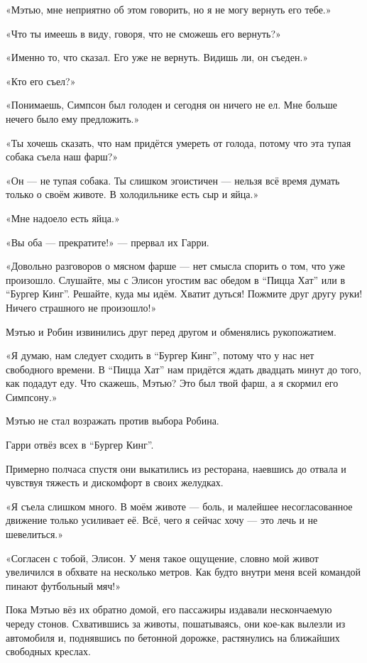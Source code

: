 \documentclass[a5paper, 9pt,
final, openany, twoside=true]{memoir}
\begin{document}
«Мэтью, мне неприятно об этом говорить, но я не могу вернуть его тебе.»

«Что ты имеешь в виду, говоря, что не сможешь его вернуть?»

«Именно то, что сказал. Его уже не вернуть. Видишь ли, он съеден.»

«Кто его съел?»

«Понимаешь, Симпсон был голоден и сегодня он ничего не ел. Мне больше нечего было ему предложить.»

«Ты хочешь сказать, что нам придётся умереть от голода, потому что эта тупая собака съела наш фарш?»

«Он — не тупая собака. Ты слишком эгоистичен — нельзя всё время думать только о своём животе. В холодильнике есть сыр и яйца.»

«Мне надоело есть яйца.»

«Вы оба — прекратите!» — прервал их Гарри.

«Довольно разговоров о мясном фарше — нет смысла спорить о том, что уже произошло. Слушайте, мы с Элисон угостим вас обедом в ``Пицца Хат'' или в ``Бургер Кинг''. Решайте, куда мы идём. Хватит дуться! Пожмите друг другу руки! Ничего страшного не произошло!»

Мэтью и Робин извинились друг перед другом и обменялись рукопожатием.

«Я думаю, нам следует сходить в ``Бургер Кинг'', потому что у нас нет свободного времени. В ``Пицца Хат'' нам придётся ждать двадцать минут до того, как подадут еду. Что скажешь, Мэтью? Это был твой фарш, а я скормил его Симпсону.»

Мэтью не стал возражать против выбора Робина.

Гарри отвёз всех в ``Бургер Кинг''.\bigskip

Примерно полчаса спустя они выкатились из ресторана, наевшись до отвала и чувствуя тяжесть и дискомфорт в своих желудках.

«Я съела слишком много. В моём животе — боль, и малейшее несогласованное движение только усиливает её. Всё, чего я сейчас хочу — это лечь и не шевелиться.»

«Согласен с тобой, Элисон. У меня такое ощущение, словно мой живот увеличился в обхвате на несколько метров. Как будто внутри меня всей командой пинают футбольный мяч!»

Пока Мэтью вёз их обратно домой, его пассажиры издавали нескончаемую череду стонов. Схватившись за животы, пошатываясь, они кое-как вылезли из автомобиля и, поднявшись по бетонной дорожке, растянулись на ближайших свободных креслах.
\end{document}

